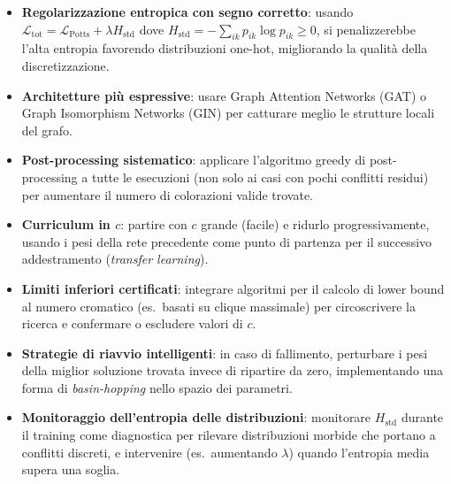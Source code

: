 \documentclass[11pt, a4paper]{article}
\begin{document}
\begin{itemize}
    \item \textbf{Regolarizzazione entropica con segno corretto}: usando
    $\mathcal{L}_{\mathrm{tot}} = \mathcal{L}_{\mathrm{Potts}} + \lambda H_{\mathrm{std}}$
    dove $H_{\mathrm{std}} = -\sum_{ik} p_{ik}\log p_{ik} \geq 0$, si penalizzerebbe
    l'alta entropia favorendo distribuzioni one-hot, migliorando la qualità della
    discretizzazione.
    \item \textbf{Architetture più espressive}: usare Graph Attention Networks (GAT) o
    Graph Isomorphism Networks (GIN) per catturare meglio le strutture locali del grafo.
    \item \textbf{Post-processing sistematico}: applicare l'algoritmo greedy di
    post-processing a tutte le esecuzioni (non solo ai casi con pochi conflitti residui)
    per aumentare il numero di colorazioni valide trovate.
    \item \textbf{Curriculum in $c$}: partire con $c$ grande (facile) e ridurlo
    progressivamente, usando i pesi della rete precedente come punto di partenza per il
    successivo addestramento (\textit{transfer learning}).
    \item \textbf{Limiti inferiori certificati}: integrare algoritmi per il calcolo di
    lower bound al numero cromatico (es.\ basati su clique massimale) per circoscrivere
    la ricerca e confermare o escludere valori di $c$.
    \item \textbf{Strategie di riavvio intelligenti}: in caso di fallimento, perturbare i
    pesi della miglior soluzione trovata invece di ripartire da zero, implementando una
    forma di \textit{basin-hopping} nello spazio dei parametri.
    \item \textbf{Monitoraggio dell'entropia delle distribuzioni}: monitorare
    $H_{\mathrm{std}}$ durante il training come diagnostica per rilevare distribuzioni
    morbide che portano a conflitti discreti, e intervenire (es.\ aumentando $\lambda$)
    quando l'entropia media supera una soglia.
\end{itemize}
\end{document}
